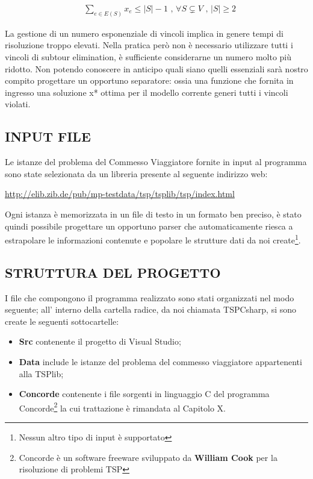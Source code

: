\documentclass[11pt]{article}
\begin{document}
\begin{eqnarray}
&\displaystyle{\sum_{e \in E(S)}x_e \leq |S| - 1} \text{ , } \forall S \subsetneq V \text{ , } |S| \geq 2
\end{eqnarray}

La gestione di un numero esponenziale di vincoli implica in genere tempi di risoluzione troppo elevati. Nella pratica però non è necessario utilizzare tutti i vincoli di subtour elimination, è sufficiente considerarne un numero molto più ridotto. Non potendo conoscere in anticipo quali siano quelli essenziali sarà nostro compito progettare un opportuno separatore: ossia una funzione che fornita in ingresso una soluzione x* ottima per il modello corrente generi tutti i vincoli violati.

\subsection*{INPUT FILE}

Le istanze del problema del Commesso Viaggiatore fornite in input al programma sono state selezionata da un libreria presente al seguente indirizzo web: 

\begin{center}
\href{http://elib.zib.de/pub/mp-testdata/tsp/tsplib/tsp/index.html}{http://elib.zib.de/pub/mp-testdata/tsp/tsplib/tsp/index.html}
\end{center}

Ogni istanza è memorizzata in un file di testo in un formato ben preciso, è stato quindi possibile progettare un opportuno parser che automaticamente riesca a estrapolare le informazioni contenute e popolare le strutture dati da noi create\footnote{Nessun altro tipo di input è supportato}.

\subsection*{STRUTTURA DEL PROGETTO}

I file che compongono il programma realizzato sono stati organizzati nel modo seguente; all' interno della cartella radice, da noi chiamata TSPCsharp, si sono create le seguenti sottocartelle:

\begin{itemize}
\item \textbf{Src} contenente il progetto di Visual Studio;
\item \textbf{Data} include le istanze del problema del commesso viaggiatore appartenenti alla TSPlib;
\item \textbf{Concorde} contenente i file sorgenti in linguaggio C del programma Concorde\footnote{Concorde è un software freeware sviluppato da \textbf{William Cook} per la risoluzione di problemi TSP} la cui trattazione è rimandata al Capitolo X.
\end{itemize}
\end{document}
